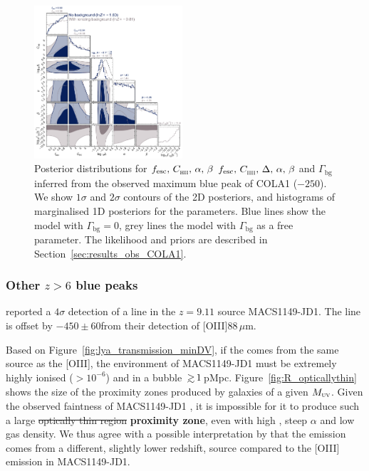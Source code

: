 \documentclass[fleqn,usenatbib]{mnras}
\providecommand{\DIFadd}[1]{{\protect\color{Green} \bf #1}} %
\providecommand{\DIFdel}[1]{{\protect\color{lightgray} \footnotesize \sout{#1}}} %
\providecommand{\DIFaddbegin}{} %
\providecommand{\DIFaddend}{} %
\providecommand{\DIFdelbegin}{} %
\providecommand{\DIFdelend}{} %
\providecommand{\DIFaddFL}[1]{\DIFadd{#1}} %
\providecommand{\DIFdelFL}[1]{\DIFdel{#1}} %
\providecommand{\DIFaddbeginFL}{} %
\providecommand{\DIFaddendFL}{} %
\providecommand{\DIFdelbeginFL}{} %
\providecommand{\DIFdelendFL}{} %
\newcommand{\DIFscaledelfig}{0.5}
\newlength{\DIFdelgraphicswidth} %
\newlength{\DIFdelgraphicsheight} %
\newcommand{\DIFaddincludegraphics}[2][]{{\color{blue}\fbox{\DIFOincludegraphics[#1]{#2}}}} %
\newcommand{\DIFdelincludegraphics}[2][]{%
\sbox{\DIFdelgraphicsbox}{\DIFOincludegraphics[#1]{#2}}%
\settoboxwidth{\DIFdelgraphicswidth}{\DIFdelgraphicsbox} %
\settoboxtotalheight{\DIFdelgraphicsheight}{\DIFdelgraphicsbox} %
\scalebox{\DIFscaledelfig}{%
\parbox[b]{\DIFdelgraphicswidth}{\usebox{\DIFdelgraphicsbox}\\[-\baselineskip] \rule{\DIFdelgraphicswidth}{0em}}\llap{\resizebox{\DIFdelgraphicswidth}{\DIFdelgraphicsheight}{%
\setlength{\unitlength}{\DIFdelgraphicswidth}%
\begin{picture}(1,1)%
\thicklines\linethickness{2pt} %
{\color[rgb]{1,0,0}\put(0,0){\framebox(1,1){}}}%
{\color[rgb]{1,0,0}\put(0,0){\line( 1,1){1}}}%
{\color[rgb]{1,0,0}\put(0,1){\line(1,-1){1}}}%
\end{picture}%
}\hspace*{3pt}}} %
} %
\DeclareRobustCommand{\DIFaddbegin}{\DIFOaddbegin \let\includegraphics\DIFaddincludegraphics} %
\DeclareRobustCommand{\DIFaddend}{\DIFOaddend \let\includegraphics\DIFOincludegraphics} %
\DeclareRobustCommand{\DIFdelbegin}{\DIFOdelbegin \let\includegraphics\DIFdelincludegraphics} %
\DeclareRobustCommand{\DIFdelend}{\DIFOaddend \let\includegraphics\DIFOincludegraphics} %
\DeclareRobustCommand{\DIFaddbeginFL}{\DIFOaddbeginFL \let\includegraphics\DIFaddincludegraphics} %
\DeclareRobustCommand{\DIFaddendFL}{\DIFOaddendFL \let\includegraphics\DIFOincludegraphics} %
\DeclareRobustCommand{\DIFdelbeginFL}{\DIFOdelbeginFL \let\includegraphics\DIFdelincludegraphics} %
\DeclareRobustCommand{\DIFdelendFL}{\DIFOaddendFL \let\includegraphics\DIFOincludegraphics} %
\begin{document}
\begin{figure}
    \includegraphics[width=0.49\textwidth]{figs/fig7.pdf}
    \caption{Posterior distributions for \DIFdelbeginFL \DIFdelFL{$\fesc, \, \clump, \, \alpha, \, \beta$ }\DIFdelendFL \DIFaddbeginFL \DIFaddFL{$\fesc, \, \clump, \, \Delta, \, \alpha, \, \beta$ }\DIFaddendFL and $\Gamma_\textrm{bg}$ inferred from the observed maximum blue \lya peak of COLA1 ($-250$\kms). We show $1\sigma$ and $2\sigma$ contours of the 2D posteriors, and histograms of marginalised 1D posteriors for the parameters. Blue lines show the model with $\Gamma_\mathrm{bg}=0$, grey lines the model with $\Gamma_\mathrm{bg}$ as a free parameter. The likelihood and priors are described in Section~\ref{sec:results_obs_COLA1}.}
    \label{fig:COLA1}
\end{figure}

\subsubsection{Other $z>6$ blue peaks}
\label{sec:results_obs_other}

\citet{Hashimoto2018a} reported a $4\sigma$ detection of a \lya line in the $z=9.11$ source MACS1149-JD1. The \lya line is offset by $-450\pm60$\kms from their detection of [OIII]88\,$\mu$m. 

Based on Figure~\ref{fig:lya_transmission_minDV}, if the \lya comes from the same source as the [OIII], the environment of MACS1149-JD1 must be extremely highly ionised ($>10^{-6}$) and in a bubble $\simgt1$\,pMpc. Figure~\ref{fig:R_opticallythin} shows the size of the proximity zones produced by galaxies of a given $\MUV$. Given the observed faintness of MACS1149-JD1 \citep[$\MUV = 18.5\pm0.1$ based on lens modelling and fits to photometry and grism spectroscopy,][]{Hoag2018a}, it is impossible for it to produce such a large \DIFdelbegin \DIFdel{optically thin region}\DIFdelend \DIFaddbegin \DIFadd{proximity zone}\DIFaddend , even with high \fesc, steep $\alpha$ and low gas density. We thus agree with a possible interpretation by \citet{Hashimoto2018a} that the \lya emission comes from a different, slightly lower redshift, source compared to the [OIII] emission in MACS1149-JD1.
\end{document}
